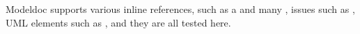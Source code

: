 Modeldoc supports various inline references, such as a  and many ,
issues such as ,
UML elements such as ,
and they are all tested here.